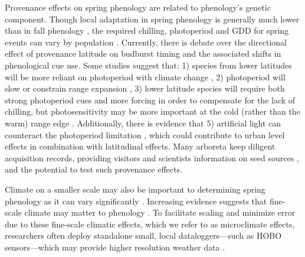 \documentclass{article}\usepackage[]{graphicx}\usepackage[]{color}
\begin{document}
Provenance effects on spring phenology are related to phenology's genetic component. Though local adaptation in spring phenology is generally much lower than in fall phenology \citep{McKown2013, Aitken2015, Vico2021}, the required chilling, photoperiod and GDD for spring events can vary by population \citep{Scotti2004,Cuervo-Alarcon2018,Wu2022}. Currently, there is debate over the directional effect of provenance latitude on budburst timing and the associated shifts in phenological cue use. Some studies suggest that: 1) species from lower latitudes will be more reliant on photoperiod with climate change \citep{Zohner2016}, 2) photoperiod will slow or constrain range expansion \citep{Saikkonen2012}, 3) lower latitude species will require both strong photoperiod cues and more forcing in order to compensate for the lack of chilling, but photosensitivity may be more important at the cold (rather than the warm) range edge \citep{Gauzere2017}. Additionally, there is evidence that 5) artificial light can counteract the photoperiod limitation \citep{Meng2022}, which could contribute to urban level effects in combination with latitudinal effects. Many arboreta keep diligent acquisition records, providing visitors and scientists information on seed sources \citep{Dosmann2006}, and the potential to test such provenance effects. 
  
Climate on a smaller scale may also be important to determining spring phenology as it can vary significantly \citep[e.g., as much as 2.6$^{\circ}$C between sensors at the same site or up to 6.6$^{\circ}$C within 1 km spatial units in northern Europe,][]{Lenoir2013,deResseguier2020}. Increasing evidence suggests that fine-scale climate may matter to phenology \citep{Lembrechts2019,Laigle2021}. To facilitate scaling and minimize error due to these fine-scale climatic effects, which we refer to as microclimate effects, researchers often deploy standalone small, local dataloggers---such as HOBO sensors---which may provide higher resolution weather data \citep{Schwartz2013a,Whiteman2000}.  
 
\end{document}
